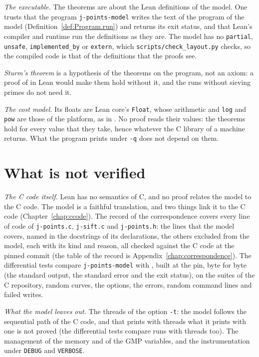 \emph{The executable.} The theorems are about the Lean definitions of the model. One trusts that the
program \verb|j-points-model| writes the text of the program of the model
(Definition~\ref{def:Program.run}) and returns its exit status, and that Lean's compiler and runtime
run the definitions as they are. The model has no \verb|partial|, \verb|unsafe|,
\verb|implemented_by| or \verb|extern|, which \verb|scripts/check_layout.py| checks, so the compiled
code is that of the definitions that the proofs see.

\emph{Sturm's theorem} is a hypothesis of the theorems on the program, not an axiom: a proof of
 in Lean would make them hold without it, and the runs without sieving
primes do not need it.

\emph{The cost model.} Its floats are Lean core's \verb|Float|, whose arithmetic and \texttt{log}
and \texttt{pow} are those of the platform, as in \jpoints{}. No proof reads their values: the
theorems hold for every value that they take, hence whatever the C library of a machine returns.
What the program prints under \verb|-q| does not depend on them.

\section{What is not verified}\label{sec:overviewNot}

\emph{The C code itself.} Lean has no semantics of C, and no proof relates the model to the C code.
The model is a faithful translation, and two things link it to the C code
(Chapter~\ref{chap:ccode}). The record of the correspondence covers every line of code of
\verb|j-points.c|, \verb|j-sift.c| and \verb|j-points.h|: the lines that the model covers, named in
the docstrings of its declarations, the others excluded from the model, each with its kind and
reason, all checked against the C code at the pinned commit (the table of the record is
Appendix~\ref{chap:correspondence}). The differential tests compare \verb|j-points-model| with
\jpoints{}, built at the pin, byte for byte (the standard output, the standard error and the exit
status), on the suites of the C repository, random curves, the options, the errors, random command
lines and failed writes.

\emph{What the model leaves out.} The threads of the option \verb|-t|: the model follows the
sequential path of the C code, and that \jpoints{} prints with threads what it prints with one is
not proved (the differential tests compare runs with threads too). The management of the memory and
of the GMP variables, and the instrumentation under \verb|DEBUG| and \verb|VERBOSE|.

